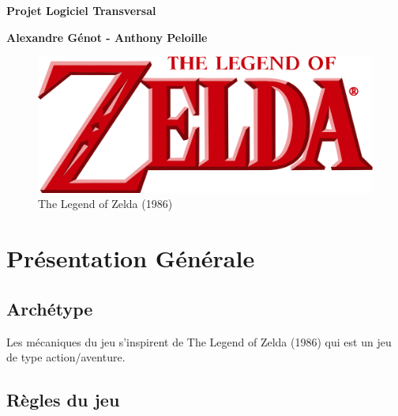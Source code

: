 \documentclass[a4paper,12pt]{article}
\begin{document}
\thispagestyle{empty}

\begin{titlepage}

\vspace*{2cm}

\begin{center}\textbf{\Huge Projet Logiciel Transversal}\end{center}{\Large \par}

\begin{center}\textbf{\large Alexandre Génot - Anthony Peloille}\end{center}{\large \par}

\vspace{2cm}

\begin{figure}[h]
\begin{center}
\includegraphics[width=\textwidth]{thelegendofzelda.png}
\caption{\label{The Legend of Zelda}The Legend of Zelda (1986)}
\end{center}
\end{figure}

\clearpage

{\small
\tableofcontents
}

\end{titlepage}

\clearpage
\section{Présentation Générale}

\subsection{Archétype}

Les mécaniques du jeu s'inspirent de The Legend of Zelda (1986) qui est un jeu de type action/aventure.

\subsection{Règles du jeu}
\end{document}
